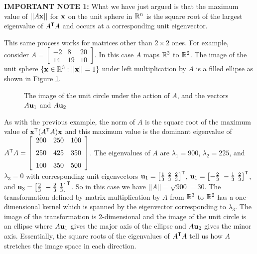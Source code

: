 \noindent \textbf{IMPORTANT NOTE 1:} What we have just argued is that the maximum value of $||A\mathbf{x}||$ for $\mathbf{x}$ on the unit sphere in $\mathbb{R}^n$ is the square root of the largest eigenvalue of $A^{\mathsf{T}}A$ and occurs at a corresponding unit eigenvector.

\begin{example} This same process works for matrices other than $2 \times 2$ ones. For example, consider $A = \left[ \begin{array}{rrr} -2&8&20 \\ 14&19&10 \end{array} \right]$. In this case $A$ maps $\mathbb{R}^3$ to $\mathbb{R}^2$. The image of the unit sphere $\{\mathbf{x} \in \mathbb{R}^3  : ||\mathbf{x}|| = 1\}$ under left multiplication by $A$ is a filled ellipse as shown in Figure \ref{F:7_c_Mat_norm_2}.
\begin{figure}[h]
\begin{center}
\end{center}
\caption{The image of the unit circle under the action of $A$, and the vectors $A\mathbf{u}_1$ and $A\mathbf{u}_2$}
\label{F:7_c_Mat_norm_2}
\end{figure}
As with the previous example, the norm of $A$ is the square root of the maximum value of $\mathbf{x}^{\mathsf{T}} (A^{\mathsf{T}}A) \mathbf{x}$ and this maximum value is the dominant eigenvalue of $A^{\tr}A =  \left[ \begin {array}{ccc} 200&250&100\\ \noalign{\medskip}250&425&350\\ \noalign{\medskip}100&350&500\end {array} \right]$. The eigenvalues of $A$ are $\lambda_1 = 900$, $\lambda_2 = 225$, and $\lambda_3 = 0$ with corresponding unit eigenvectors $\vu_1=\left[ \frac{1}{3} \ \frac{2}{3} \ \frac{2}{3} \right]^{\tr}$, $\vu_1=\left[ -\frac{2}{3} \ -\frac{1}{3} \ \frac{2}{3} \right]^{\tr}$, and $\vu_3=\left[ \frac{2}{3} \ -\frac{2}{3} \ \frac{1}{3} \right]^{\tr}$. So in this case we have $||A|| = \sqrt{900} = 30$. The transformation defined by matrix multiplication by $A$ from $\mathbb{R}^3$ to $\mathbb{R}^2$ has a one-dimensional kernel which is spanned by the eigenvector corresponding to $\lambda_3$. The image of the transformation is 2-dimensional and the image of the unit circle is an ellipse where $A\mathbf{u}_1$ gives the major axis of the ellipse and $A\mathbf{u}_2$ gives the minor axis. Essentially, the square roots of the eigenvalues of $A^{\mathsf{T}}A$ tell us how $A$ stretches the image space in each direction.
\end{example}


